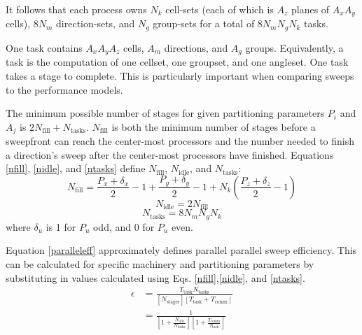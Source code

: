 \documentclass[11pt, letterpaper,titlepage,oneside]{article}
\begin{document}
It follows that each process owns $N_k$ cell-sets (each of which is $A_z$ planes of $A_x A_y$ cells), $8N_m$ direction-sets, and $N_g$ group-sets for a total of $8N_m N_g N_k$ tasks.

One task contains $A_x A_y A_z$ cells, $A_m$ directions, and $A_g$ groups. Equivalently, a task is the computation of one cellset, one groupset, and one angleset. One task takes a stage to complete.  This is particularly important when comparing sweeps to the performance models. 

The minimum possible number of stages for given partitioning parameters $P_i$ and $A_j$ is $2 N_{\text{fill}}+N_{\text{tasks}}$. $N_{\text{fill}}$ is both the minimum number of stages before a sweepfront can reach the center-most processors and the number needed to finish a direction's sweep after the center-most processors have finished. Equations \ref{nfill}, \ref{nidle}, and \ref{ntasks} define $N_{\text{fill}}$, $N_{\text{idle}}$, and $N_{\text{tasks}}$:
\begin{equation}
N_{\text{fill}} = \frac{P_x + \delta_x}{2} - 1 + \frac{P_y + \delta_y}{2} - 1 + N_k (\frac{P_z + \delta_z}{2} - 1)
\label{nfill}
\end{equation}
\begin{equation}
N_{\text{idle}} = 2 N_{\text{fill}}
\label{nidle}
\end{equation}
\begin{equation}
N_{\text{tasks}} = 8 N_m N_g N_k
\label{ntasks}
\end{equation}
where $\delta_u$ is 1 for $P_u$ odd, and 0 for $P_u$ even.

Equation \ref{paralleleff} approximately defines parallel parallel sweep efficiency. This can be calculated for specific machinery and partitioning parameters by substituting in values calculated using Eqs. \ref{nfill},\ref{nidle}, and \ref{ntasks}.
\begin{equation}\label{paralleleff}
\begin{split}
\epsilon &= \frac{T_{\text{task}} N_{\text{tasks}}}{[N_{\text{stages}}] [T_{\text{task}} + T_{\text{comm}}]} \\
            &=\frac{1}{[1+\frac{N_{\text{idle}}}{N_{\text{tasks}}}][1 + \frac{T_{\text{comm}}}{T_{\text{task}}}]}
\end{split}
\end{equation}
\end{document}
